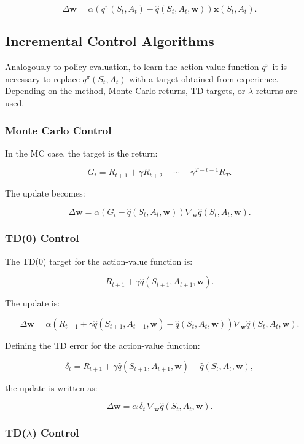 \[
\Delta \mathbf{w}
=
\alpha \left( q^\pi(S_t,A_t) - \hat{q}(S_t,A_t,\mathbf{w}) \right)
\mathbf{x}(S_t,A_t).
\]

\subsection{Incremental Control Algorithms}

Analogously to policy evaluation, to learn the action-value function $q^\pi$ it is necessary to replace $q^\pi(S_t,A_t)$ with a target obtained from experience.
Depending on the method, Monte Carlo returns, TD targets, or $\lambda$-returns are used.

\subsubsection{Monte Carlo Control}

In the MC case, the target is the return:

\[
G_t = R_{t+1} + \gamma R_{t+2} + \cdots + \gamma^{T-t-1} R_T.
\]

The update becomes:

\[
\Delta \mathbf{w}
=
\alpha \left( G_t - \hat{q}(S_t,A_t,\mathbf{w}) \right)
\nabla_{\mathbf{w}} \hat{q}(S_t,A_t,\mathbf{w}).
\]

\subsubsection{TD(0) Control}

The TD(0) target for the action-value function is:

\[
R_{t+1} + \gamma \hat{q}(S_{t+1},A_{t+1},\mathbf{w}).
\]

The update is:

\[
\Delta \mathbf{w}
=
\alpha \left( R_{t+1} + \gamma \hat{q}(S_{t+1},A_{t+1},\mathbf{w}) -
\hat{q}(S_t,A_t,\mathbf{w}) \right)
\nabla_{\mathbf{w}} \hat{q}(S_t,A_t,\mathbf{w}).
\]

Defining the TD error for the action-value function:

\[
\delta_t
=
R_{t+1} + \gamma \hat{q}(S_{t+1},A_{t+1},\mathbf{w})
-
\hat{q}(S_t,A_t,\mathbf{w}),
\]

the update is written as:

\[
\Delta \mathbf{w} = \alpha \, \delta_t \, \nabla_{\mathbf{w}} \hat{q}(S_t,A_t,\mathbf{w}).
\]

\subsubsection{TD($\lambda$) Control}

